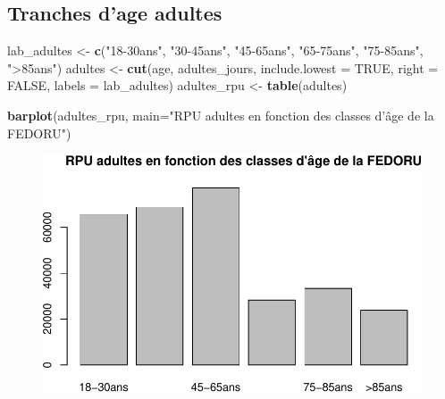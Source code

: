 \documentclass[]{article}
\newenvironment{Shaded}{\begin{snugshade}}{\end{snugshade}}
\newcommand{\KeywordTok}[1]{\textcolor[rgb]{0.13,0.29,0.53}{\textbf{{#1}}}}
\newcommand{\DataTypeTok}[1]{\textcolor[rgb]{0.13,0.29,0.53}{{#1}}}
\newcommand{\DecValTok}[1]{\textcolor[rgb]{0.00,0.00,0.81}{{#1}}}
\newcommand{\StringTok}[1]{\textcolor[rgb]{0.31,0.60,0.02}{{#1}}}
\newcommand{\CommentTok}[1]{\textcolor[rgb]{0.56,0.35,0.01}{\textit{{#1}}}}
\newcommand{\OtherTok}[1]{\textcolor[rgb]{0.56,0.35,0.01}{{#1}}}
\newcommand{\NormalTok}[1]{{#1}}
\begin{document}
\subsection{Tranches d'age adultes}\label{tranches-dage-adultes}

\begin{Shaded}
\begin{Highlighting}[]
\NormalTok{lab_adultes <-}\StringTok{ }\KeywordTok{c}\NormalTok{(}\StringTok{"18-30ans"}\NormalTok{, }\StringTok{"30-45ans"}\NormalTok{, }\StringTok{"45-65ans"}\NormalTok{, }\StringTok{"65-75ans"}\NormalTok{, }\StringTok{"75-85ans"}\NormalTok{, }\StringTok{">85ans"}\NormalTok{)}
\NormalTok{adultes <-}\StringTok{ }\KeywordTok{cut}\NormalTok{(age, adultes_jours, }\DataTypeTok{include.lowest =} \OtherTok{TRUE}\NormalTok{, }\DataTypeTok{right =} \OtherTok{FALSE}\NormalTok{, }\DataTypeTok{labels =} \NormalTok{lab_adultes)}
\NormalTok{adultes_rpu <-}\StringTok{ }\KeywordTok{table}\NormalTok{(adultes)}

\KeywordTok{barplot}\NormalTok{(adultes_rpu, }\DataTypeTok{main=}\StringTok{"RPU adultes en fonction des classes d'âge de la FEDORU"}\NormalTok{)}
\end{Highlighting}
\end{Shaded}

\begin{figure}[htbp]
\centering
\includegraphics{age_files/figure-latex/adultes-1.pdf}
\end{figure}

\begin{Shaded}
\end{Shaded}
\end{document}
